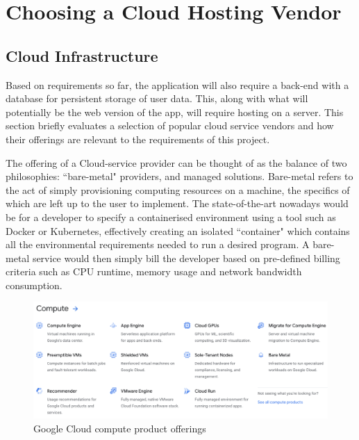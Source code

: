 \section{Choosing a Cloud Hosting Vendor}
\subsection{Cloud Infrastructure}
Based on requirements so far, the application will also require a back-end with a database for persistent storage of user data. This, along with what will potentially be the web version of the app, will require hosting on a server. This section briefly evaluates a selection of popular cloud service vendors and how their offerings are relevant to the requirements of this project.

The offering of a Cloud-service provider can be thought of as the balance of two philosophies: ``bare-metal" providers, and managed solutions. Bare-metal refers to the act of simply provisioning computing resources on a machine, the specifics of which are left up to the user to implement. The state-of-the-art nowadays would be for a developer to specify a containerised environment using a tool such as Docker or Kubernetes, effectively creating an isolated ``container" which contains all the environmental requirements needed to run a desired program. A bare-metal service would then simply bill the developer based on pre-defined billing criteria such as CPU runtime, memory usage and network bandwidth consumption.

\begin{figure}[h]
    \begin{center}
        \includegraphics[scale=0.4]{images/google_cloud_compute_offerings.png}
    \end{center}
    \caption{Google Cloud compute product offerings}
    \label{gcp_compute_offerings}
\end{figure}

